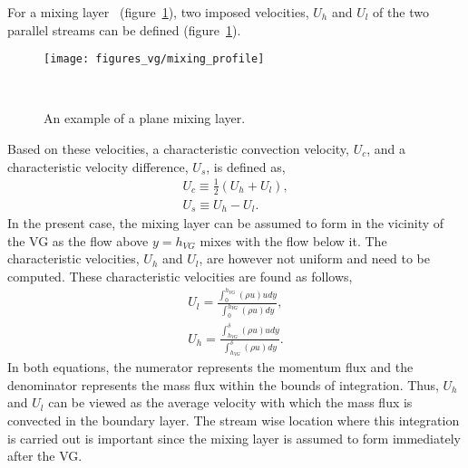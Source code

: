 For a mixing layer~\cite{pope_2000} (figure~\ref{fig:refmixing}), two imposed velocities, $U_h$ and $U_l$ of the two parallel streams can be defined (figure~\ref{fig:refmixing}).
\begin{figure}[h!]
    \centering
    \captionsetup{justification=centering}
        \texttt{[image: figures\_vg/mixing\_profile]}
        \caption{An example of a plane mixing layer.}
        \label{fig:refmixing}
    ~ %
\end{figure}
Based on these velocities, a characteristic convection velocity, $U_c$, and a characteristic velocity difference, $U_s$, is defined as,
\begin{align*}
U_c \equiv \frac{1}{2}(U_h + U_l),\\
U_s \equiv U_h - U_l.
\end{align*}
In the present case, the mixing layer can be assumed to form in the vicinity of the VG as the flow above $y=h_{VG}$ mixes with the flow below it. The characteristic velocities, $U_h$ and $U_l$, are however not uniform and need to be computed. These characteristic velocities are found as follows,
\begin{eqnarray}
U_l = \frac{\int^{h_{VG}}_{0}(\rho u) u dy}{\int^{h_{VG}}_{0}(\rho u)dy},\\
U_h = \frac{\int_{h_{VG}}^{\delta}(\rho u)u dy}{\int_{h_{VG}}^{\delta}(\rho u)dy}.
\end{eqnarray}
In both equations, the numerator represents the momentum flux and the denominator represents the mass flux within the bounds of integration. Thus, $U_h$ and $U_l$ can be viewed as the average velocity with which the mass flux is convected in the boundary layer. The stream wise location where this integration is carried out is important since the mixing layer is assumed to form immediately after the VG.

